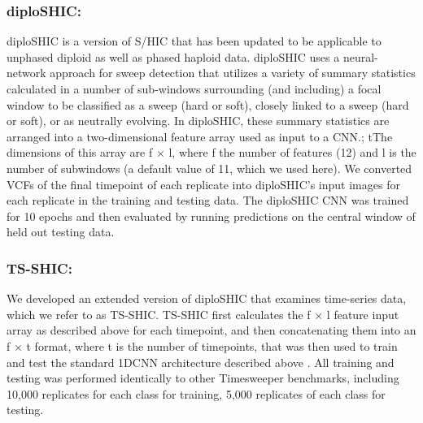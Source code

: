 \subsubsection{diploSHIC: } diploSHIC \cite{kernDiploSHICUpdated2018} is a version of S/HIC \cite{schriderHICRobustIdentification2016} that has been updated to be applicable to unphased diploid as well as phased haploid data. diploSHIC uses a neural-network approach for sweep detection that utilizes a variety of summary statistics calculated in a number of sub-windows surrounding (and including) a focal window to be classified as a sweep (hard or soft), closely linked to a sweep (hard or soft), or as neutrally evolving. In diploSHIC, these summary statistics are arranged into a two-dimensional feature array used as input to a CNN.; tThe dimensions of this array are f × l, where f the number of features (12) and l is the number of subwindows (a default value of 11, which we used here). We converted VCFs of the final timepoint of each replicate into diploSHIC’s input images for each replicate in the training and testing data. The diploSHIC CNN was trained for 10 epochs and then evaluated by running predictions on the central window of held out testing data.

\subsubsection{TS-SHIC: } We developed an extended version of diploSHIC that examines time-series data, which we refer to as TS-SHIC. TS-SHIC first calculates the f × l feature input array as described above for each timepoint, and then concatenating them into an f × t format, where t is the number of timepoints, that was then used to train and test the standard 1DCNN architecture described above . All training and testing was performed identically to other Timesweeper benchmarks, including 10,000 replicates for each class for training, 5,000 replicates of each class for testing. \\
 
